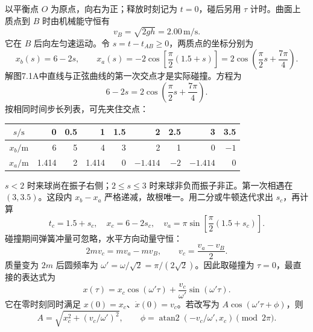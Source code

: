 \documentclass[UTF8,fontset=fandol,a4paper,11pt]{ctexart}
\newcommand{\figcaption}[1]{\par\vspace{2pt}{\small\color{muted}#1}\par}
\begin{document}
\begin{center}\begin{minipage}{\linewidth}\centering{}\figcaption{解图 7.1A}\end{minipage}\end{center}
以平衡点 $O$ 为原点，向右为正；释放时刻记为 $t=0$，碰后另用 $\tau$ 计时。曲面上质点到 $B$ 时由机械能守恒有
\[v_B=\sqrt{2gh}=2.00\,\mathrm{m/s}.\]
它在 $B$ 后向左匀速运动。令 $s=t-t_{AB}\ge0$，两质点的坐标分别为
\[x_b(s)=6-2s,\qquad x_a(s)=-2\cos\left[\frac\pi2(1.5+s)\right]
=2\cos\left(\frac\pi2s+\frac{7\pi}4\right).\]
解图7.1A中直线与正弦曲线的第一次交点才是实际碰撞。方程为
\[6-2s=2\cos\left(\frac\pi2s+\frac{7\pi}4\right).\]
按相同时间步长列表，可先夹住交点：
\begin{center}\begin{tabular}{c|rrrrrrrr}
$s/\mathrm s$&0&0.5&1&1.5&2&2.5&3&3.5\\\hline
$x_b/\mathrm m$&6&5&4&3&2&1&0&$-1$\\
$x_a/\mathrm m$&1.414&2&1.414&0&$-1.414$&$-2$&$-1.414$&0
\end{tabular}\end{center}
$s<2$ 时来球尚在振子右侧；$2\le s\le3$ 时来球非负而振子非正。第一次相遇在 $(3,3.5)$。这段内 $x_b-x_a$ 严格递减，故根唯一。用二分或牛顿迭代求出 $s_c$，再计算
\[t_c=1.5+s_c,\quad x_c=6-2s_c,\quad
v_a=\pi\sin\left[\frac\pi2(1.5+s_c)\right].\]
碰撞期间弹簧冲量可忽略，水平方向动量守恒：
\[2m v_c=m v_a-m v_B,\qquad v_c=\frac{v_a-v_B}{2}.\]
质量变为 $2m$ 后圆频率为 $\omega'=\omega/\sqrt2=\pi/(2\sqrt2)$。因此取碰撞为 $\tau=0$，最直接的表达式为
\[\boxed{x(\tau)=x_c\cos(\omega'\tau)+\frac{v_c}{\omega'}\sin(\omega'\tau).}\]
它在零时刻同时满足 $x(0)=x_c$、$\dot x(0)=v_c$。若改写为 $A\cos(\omega'\tau+\phi)$，则
\[A=\sqrt{x_c^2+(v_c/\omega')^2},\qquad
\phi=\operatorname{atan2}(-v_c/\omega',x_c)\pmod{2\pi}.\]
\end{document}

